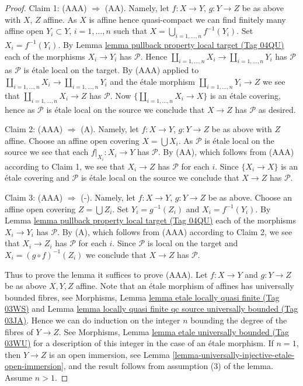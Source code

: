 \documentclass{amsart}
\theoremstyle{plain}
\theoremstyle{definition}
\theoremstyle{remark}
\numberwithin{equation}{subsection}
\begin{document}
\begin{proof}
\medskip\noindent
Claim 1: (AAA) $\Rightarrow$ (AA).
Namely, let $f : X \to Y$, $g : Y \to Z$ be as above with $X$, $Z$ affine.
As $X$ is affine hence quasi-compact we can find finitely many
affine open $Y_i \subset Y$, $i = 1, \ldots, n$ such that
$X = \bigcup_{i = 1, \ldots, n} f^{-1}(Y_i)$. Set $X_i = f^{-1}(Y_i)$. By
Lemma \href{https://stacks.math.columbia.edu/tag/04QU}{lemma pullback property local target (Tag 04QU)}
each of the morphisms $X_i \to Y_i$ has $\mathcal{P}$.
Hence $\coprod_{i = 1, \ldots, n} X_i \to \coprod_{i = 1, \ldots, n} Y_i$
has $\mathcal{P}$ as $\mathcal{P}$ is \'etale local on the target.
By (AAA) applied to
$\coprod_{i = 1, \ldots, n} X_i \to \coprod_{i = 1, \ldots, n} Y_i$
and the \'etale morphism $\coprod_{i = 1, \ldots, n} Y_i \to Z$
we see that $\coprod_{i = 1, \ldots, n} X_i \to Z$ has $\mathcal{P}$.
Now $\{\coprod_{i = 1, \ldots, n} X_i \to X\}$ is an \'etale
covering, hence as $\mathcal{P}$ is \'etale local on the source
we conclude that $X \to Z$ has $\mathcal{P}$ as desired.

\medskip\noindent
Claim 2: (AAA) $\Rightarrow$ (A).
Namely, let $f : X \to Y$, $g : Y \to Z$ be as above with $Z$ affine.
Choose an affine open covering $X = \bigcup X_i$.
As $\mathcal{P}$ is \'etale local on the source we see that
each $f|_{X_i} : X_i \to Y$ has $\mathcal{P}$.
By (AA), which follows from (AAA) according to Claim 1, we see that
$X_i \to Z$ has $\mathcal{P}$ for each $i$.
Since $\{X_i \to X\}$ is an \'etale covering and $\mathcal{P}$ is \'etale
local on the source we conclude that
$X \to Z$ has $\mathcal{P}$.

\medskip\noindent
Claim 3: (AAA) $\Rightarrow$ (-).
Namely, let $f : X \to Y$, $g : Y \to Z$ be as above.
Choose an affine open covering $Z = \bigcup Z_i$.
Set $Y_i = g^{-1}(Z_i)$ and $X_i = f^{-1}(Y_i)$. By
Lemma \href{https://stacks.math.columbia.edu/tag/04QU}{lemma pullback property local target (Tag 04QU)}
each of the morphisms $X_i \to Y_i$ has $\mathcal{P}$.
By (A), which follows from (AAA) according to Claim 2, we see that
$X_i \to Z_i$ has $\mathcal{P}$ for each $i$.
Since $\mathcal{P}$ is local on the target and $X_i = (g \circ f)^{-1}(Z_i)$
we conclude that $X \to Z$ has $\mathcal{P}$.

\medskip\noindent
Thus to prove the lemma it suffices to prove (AAA).
Let $f : X \to Y$ and $g : Y \to Z$ be as above $X, Y, Z$ affine.
Note that an \'etale morphism of affines has universally bounded fibres, see
Morphisms,
Lemma \href{https://stacks.math.columbia.edu/tag/03WS}{lemma etale locally quasi finite (Tag 03WS)} and
Lemma \href{https://stacks.math.columbia.edu/tag/03JA}{lemma locally quasi finite qc source universally bounded (Tag 03JA)}.
Hence we can do induction on the integer $n$ bounding the degree of the fibres
of $Y \to Z$. See
Morphisms, Lemma \href{https://stacks.math.columbia.edu/tag/03WU}{lemma etale universally bounded (Tag 03WU)}
for a description of this integer in the case of an \'etale morphism.
If $n = 1$, then $Y \to Z$ is an open immersion, see
Lemma \ref{lemma-universally-injective-etale-open-immersion},
and the result follows from assumption (3) of the lemma. Assume $n > 1$.


\end{proof}
\end{document}
